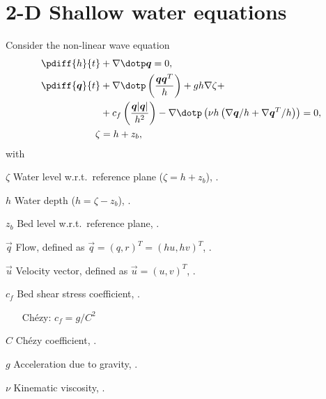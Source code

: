 \chapter{2-D Shallow water equations}
Consider the non-linear wave equation
\begin{subequations}
    \begin{align}
    \pdiff{h}{t} & + \nabla \dotp \vec{q}  = 0,
    \\
    \pdiff{\vec{q}}{t} & + \nabla \dotp \left( \frac{\vec{q}\vec{q}^T}{h} \right) + gh \nabla \zeta +
    \nonumber \\
    & + c_f \left( \frac{\vec{q}\abs{\vec{q}}}{h^2} \right)
    - \nabla \dotp \left( \nu h \left(  \nabla \vec{q}/h + \nabla \vec{q}^T/h \right) \right) = 0,
    \\
    \zeta & = h + z_b,
\end{align}
\end{subequations}
with
\begin{symbollist}
    \item[$\zeta$] Water level  w.r.t.\ reference plane ($\zeta = h + z_b$), \bunit{\metre}.
    \item[$h$] Water depth ($h = \zeta - z_b$), \bunit{\metre}.
    \item[$z_b$] Bed level  w.r.t.\ reference plane, \bunit{\metre}.
    \item[$\vec{q}$] Flow, defined as $\vec{q} = (q, r)^T = (hu, hv)^T$, \bunit{\square\metre\per\second}.
    \item[$\vec{u}$] Velocity vector, defined as $\vec{u} = (u, v)^T$, \bunit{\metre\per\second}.
    \item[$c_f$] Bed shear stress coefficient, \bunit{-}.
    \begin{itemize}
        \item[Ch\'ezy:] $c_f = g/C^2$
    \end{itemize}
    \item[$C$] Ch\'ezy coefficient, .

    \item[$g$] Acceleration due to gravity, \bunit{\metre\per\square\second}.
    \item[$\nu$] Kinematic viscosity, \bunit{\square\metre\per\second}.
\end{symbollist}
